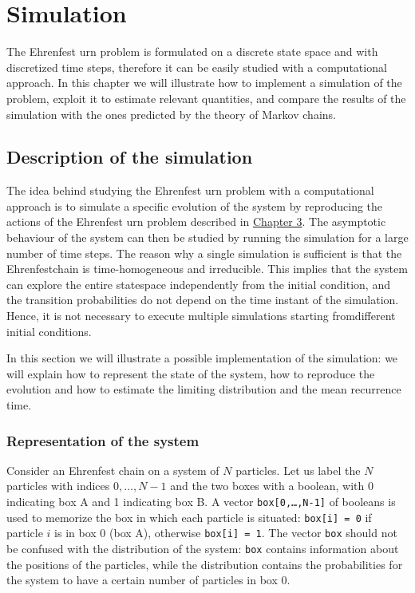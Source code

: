 \chapter{Simulation}
The Ehrenfest urn problem is formulated on a discrete state space and with discretized time steps, therefore it can be easily studied with a computational approach. In this chapter we will illustrate how to implement a simulation of the problem, exploit it to estimate relevant quantities, and compare the results of the simulation with the ones predicted by the theory of Markov chains.

\section{Description of the simulation}
The idea behind studying the Ehrenfest urn problem with a computational approach is to simulate a specific evolution of the system by reproducing the actions of the Ehrenfest urn problem described in \hyperref[ch:3]{Chapter 3}. The asymptotic behaviour of the system can then be studied by running the simulation for a large number of time steps. The reason why a single simulation is sufficient is that the Ehrenfestchain is time-homogeneous and irreducible.  This implies that the system can explore the entire statespace independently from the initial condition, and the transition probabilities do not depend on the time instant of the simulation. Hence, it is not necessary to execute multiple simulations starting fromdifferent initial conditions.

In this section we will illustrate a possible implementation of the simulation: we will explain how to represent the state of the system, how to reproduce the evolution and how to estimate the limiting distribution and the mean recurrence time.

\subsection{Representation of the system}
Consider an Ehrenfest chain on a system of $N$ particles. Let us label the $N$ particles with indices $0, \dots,N-1$ and the two boxes with a boolean, with 0 indicating box A and 1 indicating box B. A vector \texttt{box[0,\dots,N-1]} of booleans is used to memorize the box in which each particle is situated: \texttt{box[i] = 0} if particle $i$ is in box 0 (\ie box A), otherwise \texttt{box[i] = 1}. The vector \texttt{box} should not be confused with the distribution of the system: \texttt{box} contains information about the positions of the particles, while the distribution contains the probabilities for the system to have a certain number of particles in box 0.

